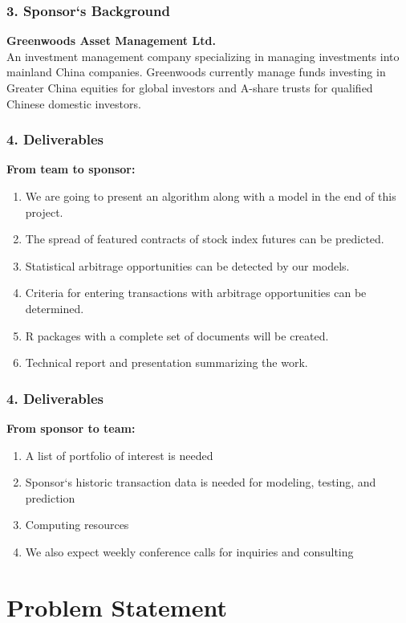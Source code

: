\documentclass[compress,handout,10pt]{beamer}
\let\olditem\item
\renewcommand{\item}{\setlength{\itemsep}{0.5\baselineskip}\olditem}
\begin{document}
\begin{frame}
    \frametitle{3. Sponsor`s Background}
{\bf{Greenwoods Asset Management Ltd.}}\\
\vspace{7pt}
 An investment management company specializing in managing investments into mainland China companies. Greenwoods currently manage funds investing in Greater China equities for global investors and A-share trusts for qualified Chinese domestic investors.
\end{frame}

\begin{frame}
    \frametitle{4. Deliverables}
{\bf{From team to sponsor:}}\\
\vspace{3pt}
    \begin{enumerate}
 \item We are going to present an algorithm along with a model in the end of this
project.
\item The spread of featured contracts of stock index futures can be predicted.
\item Statistical arbitrage opportunities can be detected by our models.
\item Criteria for entering transactions with arbitrage opportunities can be determined.
\item R packages with a complete set of documents will be created.
\item Technical report and presentation summarizing the work.
    \end{enumerate}
\end{frame}

\begin{frame}
    \frametitle{4. Deliverables}
{\bf{From sponsor to team:}}\\
\vspace{3pt}
    \begin{enumerate}
\item A list of portfolio of interest is needed
\item Sponsor`s historic transaction data is needed for modeling, testing, and prediction
\item Computing resources
\item We also expect weekly conference calls for inquiries and consulting

    \end{enumerate}
\end{frame}

\section{Problem Statement}
\end{document}
